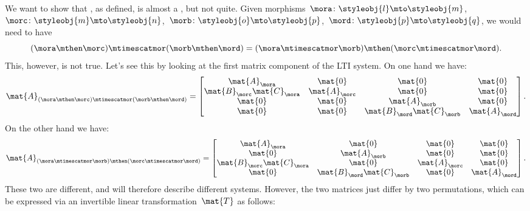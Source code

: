 \begin{example}
    We want to show that \LTI, as defined, is almost a , but not quite.
    Given morphisms~$\mora\colon \styleobj{l}\mto \styleobj{m}$,~$\morc\colon \styleobj{m}\mto \styleobj{n}$,~$\morb\colon \styleobj{o}\mto \styleobj{p}$,~$\mord\colon \styleobj{p}\mto \styleobj{q}$, we would need to have
    \begin{equation}
        (\mora \mthen \morc)
        \mtimescatmor (\morb\mthen \mord)=(\mora\mtimescatmor \morb)\mthen (\morc\mtimescatmor \mord).
    \end{equation}
    This, however, is not true.
    Let's see this by looking at the first matrix component of the LTI system.
    On one hand we have:
    \begin{equation}
        \mat{A}_{(\mora \mthen \morc)\mtimescatmor (\morb\mthen \mord)}=
        \begin{bmatrix}
            \mat{A}_\mora              & \mat{0}       & \mat{0}                    & \mat{0}       \\
            \mat{B}_\morc\mat{C}_\mora & \mat{A}_\morc & \mat{0}                    & \mat{0}       \\
            \mat{0}                    & \mat{0}       & \mat{A}_\morb              & \mat{0}       \\
            \mat{0}                    & \mat{0}       & \mat{B}_\mord\mat{C}_\morb & \mat{A}_\mord
        \end{bmatrix}.
    \end{equation}
    On the other hand we have:
    \begin{equation}
        \mat{A}_{(\mora\mtimescatmor \morb)\mthen (\morc\mtimescatmor \mord)}=
        \begin{bmatrix}
            \mat{A}_\mora               & \mat{0}                     & \mat{0}       & \mat{0}       \\
            \mat{0}                     & \mat{A}_\morb               & \mat{0}       & \mat{0}       \\
            \mat{B}_\morc \mat{C}_\mora & \mat{0}                     & \mat{A}_\morc & \mat{0}       \\
            \mat{0}                     & \mat{B}_\mord \mat{C}_\morb & \mat{0}       & \mat{A}_\mord
        \end{bmatrix}.
    \end{equation}
    These two are different, and will therefore describe different systems.
    However, the two matrices just differ by two permutations, which can be expressed via an invertible linear transformation~$\mat{T}$ as follows:

\end{example}
